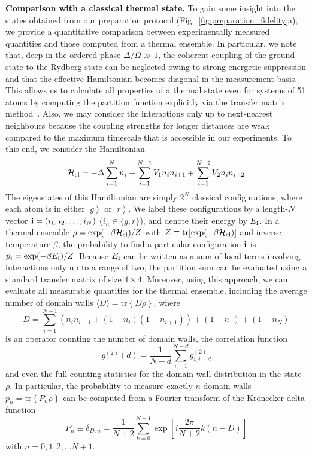 \documentclass[prl,nobalancelastpage,twocolumn,superscriptaddress,nofootinbib]{revtex4}
\newcommand{\ket}[1]{\left|#1\right\rangle}
\newcommand{\ham}{\mathcal{H}}
\newcommand{\tr}[1]{\textrm{tr}\left\{ #1 \right\}}
\newcommand{\mean}[1]{\langle #1 \rangle}
\begin{document}
\begin{footnotesize}
\noindent
\textbf{Comparison with a classical thermal state.}
To gain some insight into the states obtained from our preparation protocol
(Fig.~\ref{fig:preparation_fidelity}a), we provide a quantitative comparison between
experimentally measured quantities and those computed from a thermal ensemble.
In particular, we note that, deep in the ordered phase $\Delta/\Omega \gg 1$,
the coherent coupling of the ground state to the Rydberg state can be neglected
owing to strong energetic suppression and that the effective Hamiltonian
becomes diagonal in the measurement basis.  This allows us to calculate all
properties of a thermal state even for systems of 51 atoms by
computing the partition function explicitly via the transfer matrix
method~\cite{Baxter2007}.  Also, we may consider the interactions only up to
next-nearest neighbours because the coupling strengths for longer distances are weak
compared to the maximum timescale that is accessible in our experiments.  To this end,
we consider the Hamiltonian 
\begin{equation*}
    \ham_{\rm cl}=-\Delta\sum_{i=1}^N
n_i+\sum_{i=1}^{N-1}V_1 n_i n_{i+1}+\sum_{i=1}^{N-2}V_2 n_i n_{i+2}
\end{equation*}
The eigenstates of this Hamiltonian are simply $2^N$ classical configurations,
where each atom is in either $\ket{g}$ or $\ket{r}$. We label these
configurations by a length-$N$ vector ${\bf i}=(i_1,i_2,\dots,i_N)$
($i_n\in\{g,r\}$), and denote their energy by $E_{\bf i}$. In a thermal
ensemble $\rho=\exp(-\beta \ham_{\rm cl})/Z$ with $Z \equiv
\textrm{tr}[\exp(-\beta \ham_{\rm cl})]$ and inverse temperature $\beta$, the
probability to find a particular configuration ${\bf i}$ is $p_{\bf
i}=\exp(-\beta E_{\bf i})/Z$. Because $E_{\bf i}$ can be written as a sum of
local terms involving interactions only up to a range of two, the partition sum can
be evaluated using a standard transfer matrix of size $4\times 4$.  Moreover,
using this approach, we can evaluate all measurable quantities for the thermal
ensemble, including the average number of domain walls $\mean{D}=\tr{D\rho}$,
where 
\begin{equation*}
D=\sum_{i=1}^{N-1}( n_i n_{i+1}+(1-n_i)(1- n_{i+1}))+(1-n_1)+(1-n_N)
\end{equation*}
is an operator counting the number of domain walls, the
correlation function
\begin{equation*}
    g^{(2)}(d) = \frac{1}{N-d} \sum_{i=1}^{N-d} g^{(2)}_{i,i+d}
\end{equation*}
and even the full counting statistics for the domain wall distribution in the
state $\rho$.  In particular, the probability to measure exactly $n$ domain
walls $p_n=\tr{P_n\rho}$ can be computed from a Fourier transform of the
Kronecker delta function
\begin{equation*}
    P_n\equiv \delta_{D,n} =
\frac{1}{N+2}\sum_{k=0}^{N+1}\exp\left[i\frac{2\pi}{N+2}k(n-D)\right]
\end{equation*}
with $n=0,1,2,\dots N+1$.


\end{footnotesize}
\end{document}
